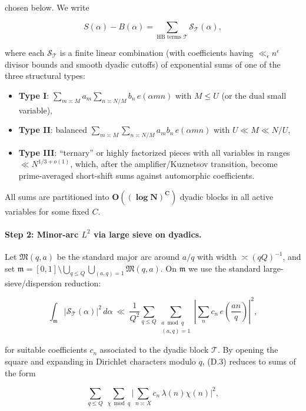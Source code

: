\documentclass[11pt]{article}
\theoremstyle{definition}
\theoremstyle{remark}
\begin{document}
chosen below. We write

$$
	S(\alpha)-B(\alpha)
	=\sum_{\text{HB terms }\mathcal T} \mathcal S_{\mathcal T}(\alpha),
$$

where each $\mathcal S_{\mathcal T}$ is a finite linear combination (with coefficients having $\ll_\epsilon n^\epsilon$ divisor bounds and smooth dyadic cutoffs) of exponential sums of one of the three structural types:

\begin{itemize}
	\item \textbf{Type I}: $\displaystyle \sum_{m\asymp M} a_m \sum_{n\asymp N/M} b_n\,e(\alpha mn)$ with $M\le U$ (or the dual small variable),
	\item \textbf{Type II}: balanced $\displaystyle \sum_{m\asymp M}\sum_{n\asymp N/M} a_m b_n\,e(\alpha mn)$ with $U\ll M\ll N/U$,
	\item \textbf{Type III}: ``ternary'' or highly factorized pieces with all variables in ranges $ \ll N^{1/3+o(1)}$, which, after the amplifier/Kuznetsov transition, become prime-averaged short-shift sums against automorphic coefficients.
\end{itemize}

All sums are partitioned into $\mathbf{O((\log N)^C)}$ dyadic blocks in all active variables for some fixed $C$.

\paragraph{Step 2: Minor-arc $L^2$ via large sieve on dyadics.}
Let $\mathfrak M(q,a)$ be the standard major arc around $a/q$ with width $\asymp (qQ)^{-1}$, and set $\mathfrak m=[0,1]\setminus \bigcup_{q\le Q}\bigcup_{(a,q)=1}\mathfrak M(q,a)$. On $\mathfrak m$ we use the standard large-sieve/dispersion reduction:

\begin{equation}
	\int_{\mathfrak m} \big|\mathcal S_{\mathcal T}(\alpha)\big|^2\,d\alpha
	\ \ll\ \frac{1}{Q^2}\sum_{q\le Q}\sum_{\substack{a\bmod q\\(a,q)=1}}
	\left|\sum_{n} c_n\,e\!\left(\frac{an}{q}\right)\right|^2,
	\tag{D.3}
\end{equation}

for suitable coefficients $c_n$ associated to the dyadic block $\mathcal T$. By opening the square and expanding in Dirichlet characters modulo $q$, (D.3) reduces to sums of the form

\begin{equation}
	\sum_{q\le Q}\ \sum_{\chi\bmod q}
	\Big|\sum_{n\asymp X} c_n\,\lambda(n)\chi(n)\Big|^2,
	\tag{D.4}
\end{equation}
\end{document}
